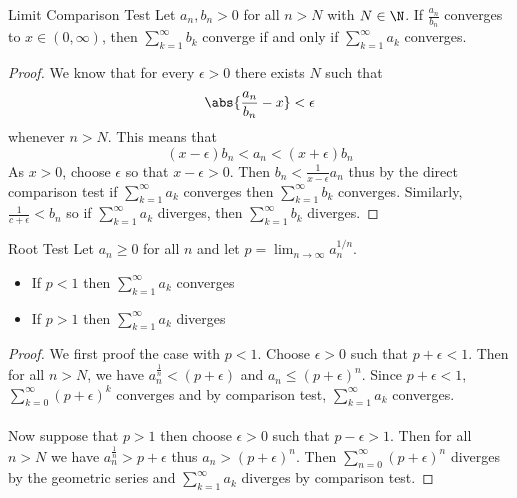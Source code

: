 \begin{thm}{Limit Comparison Test}{} Let $a_n, b_n>0$ for all $n>N$ with $N\in\N$. If $\frac{a_n}{b_n}$ converges to $x\in(0,\infty)$, then $\sum_{k=1}^\infty b_k$ converge if and only if $\sum_{k=1}^\infty a_k$ converges. \tcbline
\begin{proof} We know that for every $\epsilon>0$ there exists $N$ such that $$\abs{\frac{a_n}{b_n}-x}<\epsilon$$ whenever $n>N$. This means that $$(x-\epsilon)b_n<a_n<(x+\epsilon)b_n$$ As $x>0$, choose $\epsilon$ so that $x-\epsilon>0$. Then $b_n<\frac{1}{x-\epsilon}a_n$ thus by the direct comparison test if $\sum_{k=1}^\infty a_k$ converges then $\sum_{k=1}^\infty b_k$ converges. Similarly, $\frac{1}{c+\epsilon}<b_n$ so if $\sum_{k=1}^\infty a_k$ diverges, then $\sum_{k=1}^\infty b_k$ diverges. 
\end{proof}
\end{thm}

\begin{thm}{Root Test}{} Let $a_n\geq0$ for all $n$ and let $p=\lim_{n\to\infty}a_n^{1/n}$. 
\begin{itemize}
\item If $p<1$ then $\sum_{k=1}^\infty a_k$ converges
\item If $p>1$ then $\sum_{k=1}^\infty a_k$ diverges
\end{itemize} \tcbline
\begin{proof} We first proof the case with $p<1$. Choose $\epsilon>0$ such that $p+\epsilon<1$. Then for all $n>N$, we have $a_n^\frac{1}{n}<(p+\epsilon)$ and $a_n\leq(p+\epsilon)^n$. Since $p+\epsilon<1$, $\sum_{k=0}^{\infty}(p+\epsilon)^k$ converges and by comparison test, $\sum_{k=1}^\infty a_k$ converges. \\~\\
Now suppose that $p>1$ then choose $\epsilon>0$ such that $p-\epsilon>1$. Then for all $n>N$ we have $a_n^\frac{1}{n}>p+\epsilon$ thus $a_n>(p+\epsilon)^n$. Then $\sum_{n=0}^{\infty}(p+\epsilon)^n$ diverges by the geometric series and $\sum_{k=1}^\infty a_k$ diverges by comparison test. 
\end{proof}
\end{thm}

